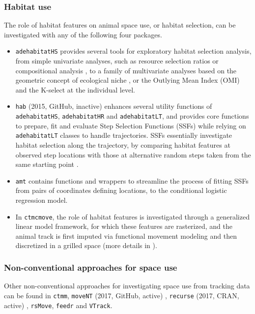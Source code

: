\documentclass[a4paper,12pt]{article}
\newcommand{\Rpkg}[1]{\texttt{#1}}
\begin{document}
	\subsubsection*{Habitat use}
	
	The role of habitat features on animal space use, or habitat selection, can be investigated with any of the following four packages. 
	
	\begin{itemize}
		\item \Rpkg{adehabitatHS} provides several tools for exploratory habitat selection analysis, from simple univariate analyses, such as resource selection ratios \citep{Manly2007} or compositional analysis \citep{Aebischer1993}, to a family of multivariate analyses based on the geometric concept of ecological niche \citep{Hutchinson1957}, or the Outlying Mean Index (OMI) \citep{Doledec2000} and the K-select \citep{Calenge2005} at the individual level.
		\item \Rpkg{hab} (2015, GitHub, inactive) \citep{Rhab} enhances several utility functions of \Rpkg{adehabitatHS}, \Rpkg{adehabitatHR} and \Rpkg{adehabitatLT}, and provides core functions to prepare, fit and evaluate Step Selection Functions (SSFs) \citep{Fortin2005} while relying on \Rpkg{adehabitatLT} classes to handle trajectories. SSFs essentially investigate habitat selection along the trajectory, by comparing habitat features at observed step locations with those at alternative random steps taken from the same starting point \citep{Thurfjell2014}.
		\item \Rpkg{amt} contains functions and wrappers to streamline the process of fitting SSFs from pairs of coordinates defining locations, to the conditional logistic regression model.
		\item In \Rpkg{ctmcmove}, the role of habitat features is investigated through a generalized linear model framework, for which these features are rasterized, and the animal track is first imputed via functional movement modeling and then discretized in a grilled space (more details in \cite{Hanks2015}). 
	\end{itemize}
	
	\subsubsection*{Non-conventional approaches for space use}
	
	Other non-conventional approaches for investigating space use from tracking data can be found in \Rpkg{ctmm}, \Rpkg{moveNT} (2017, GitHub, active) \citep{RmoveNT}, \Rpkg{recurse} (2017, CRAN, active) \citep{Bracis2018}, \Rpkg{rsMove}, \Rpkg{feedr} and \Rpkg{VTrack}. 
	
\end{document}
